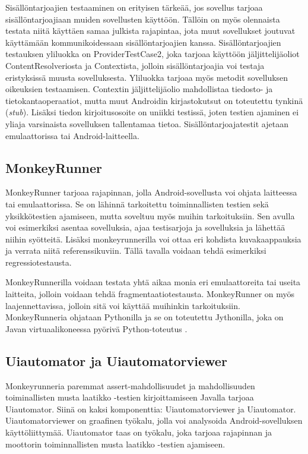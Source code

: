 Sisällöntarjoajien testaaminen on erityisen tärkeää, jos sovellus tarjoaa sisällöntarjoajiaan muiden sovellusten käyttöön. Tällöin on myös olennaista testata niitä käyttäen samaa julkista rajapintaa, jota muut sovellukset joutuvat käyttämään kommunikoidessaan sisällöntarjoajien kanssa. Sisällöntarjoajien testauksen yliluokka on ProviderTestCase2, joka tarjoaa käyttöön jäljittelijäoliot ContentResolveriosta ja Contextista, jolloin sisällöntarjoajia voi testaja eristyksissä muusta sovelluksesta. Yliluokka tarjoaa myös metodit sovelluksen oikeuksien testaamisen. Contextin jäljittelijäolio mahdollistaa tiedosto- ja tietokantaoperaatiot, mutta muut Androidin kirjastokutsut on toteutettu tynkinä (\emph{stub}). Lisäksi tiedon kirjoitusosoite on uniikki testissä, joten testien ajaminen ei yliaja varsinaista sovelluksen tallentamaa tietoa. Sisällöntarjoajatestit ajetaan emulaattorissa tai Android-laitteella. \cite{android}

\subsection{MonkeyRunner}
\label{monkeyrunner}

MonkeyRunner tarjoaa rajapinnan, jolla Android-sovellusta voi ohjata laitteessa tai emulaattorissa. Se on lähinnä tarkoitettu toiminnallisten testien sekä yksikkötestien ajamiseen, mutta soveltuu myös muihin tarkoituksiin. Sen avulla voi esimerkiksi asentaa sovelluksia, ajaa testisarjoja ja sovelluksia ja lähettää niihin syötteitä. Lisäksi monkeyrunnerilla voi ottaa eri kohdista kuvakaappauksia ja verrata niitä referenssikuviin. Tällä tavalla voidaan tehdä esimerkiksi regressiotestausta.

MonkeyRunnerilla voidaan testata yhtä aikaa monia eri emulaattoreita tai useita laitteita, jolloin voidaan tehdä fragmentaatiotestausta. MonkeyRunner on myös laajennettavissa, jolloin sitä voi käyttää muihinkin tarkoituksiin. MonkeyRunneria ohjataan Pythonilla ja se on toteutettu Jythonilla, joka on Javan virtuaalikoneessa pyörivä Python-toteutus \cite{android}.

\subsection{Uiautomator ja Uiautomatorviewer}

Monkeyrunneria paremmat assert-mahdollisuudet ja mahdollisuuden toiminallisten musta laatikko -testien kirjoittamiseen Javalla tarjoaa Uiautomator. Siinä on kaksi komponenttia: Uiautomatorviewer ja Uiautomator. Uiautomatorviewer on graafinen työkalu, jolla voi analysoida Android-sovelluksen käyttöliittymää. Uiautomator taas on työkalu, joka tarjoaa rajapinnan ja moottorin toiminnallisten musta laatikko -testien ajamiseen.

